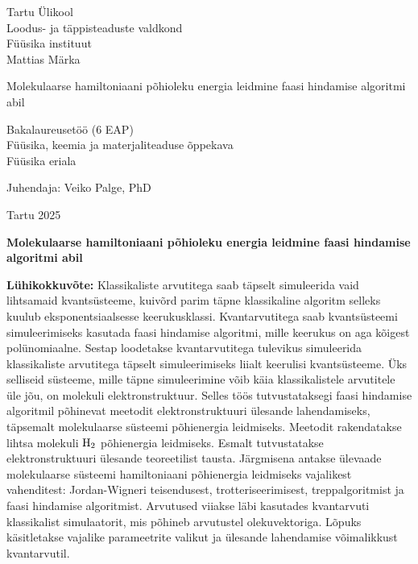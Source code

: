 \documentclass[12pt]{report}
\begin{document}
\begin{titlepage}
    \begin{center}
        \large
        {\sc Tartu Ülikool} \\
        Loodus- ja täppisteaduste valdkond \\
        Füüsika instituut \\


        \vspace{25mm}
        \Large Mattias Märka

        \vspace{4mm}
        \Huge Molekulaarse hamiltoniaani põhioleku energia leidmine faasi hindamise algoritmi abil

        \vspace{20mm}
        \Large Bakalaureusetöö (6 EAP) \\
        Füüsika, keemia ja materjaliteaduse õppekava \\
	Füüsika eriala \\

        \vspace{20mm}
        \begin{flushright}
            \Large Juhendaja: Veiko Palge, PhD
        \end{flushright}

        \vfill
        \large Tartu 2025
    \end{center}
\end{titlepage}

\newpage

\noindent\textbf{\large Molekulaarse hamiltoniaani põhioleku energia leidmine faasi hindamise algoritmi abil}

\vspace*{1ex}

\noindent\textbf{Lühikokkuvõte:}
Klassikaliste arvutitega saab täpselt simuleerida vaid lihtsamaid kvantsüsteeme, kuivõrd parim täpne klassikaline algoritm selleks kuulub eksponentsiaalsesse keerukusklassi.
Kvantarvutitega saab kvantsüsteemi simuleerimiseks kasutada faasi hindamise algoritmi, mille keerukus on aga kõigest polünomiaalne.
Sestap loodetakse kvantarvutitega tulevikus simuleerida klassikaliste arvutitega täpselt simuleerimiseks liialt keerulisi kvantsüsteeme.
Üks selliseid süsteeme, mille täpne simuleerimine võib käia klassikalistele arvutitele üle jõu, on molekuli elektronstruktuur.
Selles töös tutvustataksegi faasi hindamise algoritmil põhinevat meetodit elektronstruktuuri ülesande lahendamiseks, täpsemalt molekulaarse süsteemi põhienergia leidmiseks.
Meetodit rakendatakse lihtsa molekuli \(\rm H_2\) põhienergia leidmiseks.
Esmalt tutvustatakse elektronstruktuuri ülesande teoreetilist tausta.
Järgmisena antakse ülevaade molekulaarse süsteemi hamiltoniaani põhienergia leidmiseks vajalikest vahenditest: Jordan-Wigneri teisendusest, trotteriseerimisest, treppalgoritmist ja faasi hindamise algoritmist.
Arvutused viiakse läbi kasutades kvantarvuti klassikalist simulaatorit, mis põhineb arvutustel olekuvektoriga.
Lõpuks käsitletakse vajalike parameetrite valikut ja ülesande lahendamise võimalikkust kvantarvutil.
\end{document}
